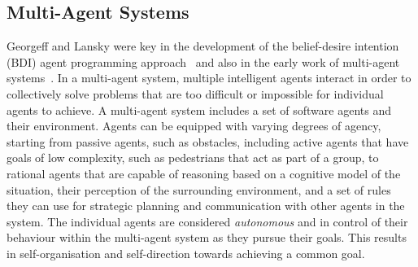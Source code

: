 \documentclass[letterpaper, 10 pt, journal, twoside]{IEEEtran}
\begin{document}



\subsection{Multi-Agent Systems}

Georgeff and Lansky were key in the development of the belief-desire intention (BDI) agent programming approach~\cite{georgeff1987reactive} and also in the early work of multi-agent systems~\cite{georgeff1988communication}.
%
In a multi-agent system, multiple intelligent agents interact in order to collectively solve problems that are too difficult or impossible for individual agents to achieve. 
%
A multi-agent system includes a set of software agents and their environment. Agents can be equipped with varying degrees of agency, starting from  passive agents, such as obstacles, including active agents that have goals of low complexity, such as pedestrians that act as part of a group, to rational agents that are capable of reasoning based on a cognitive model of the situation, their perception of the surrounding environment, and a set of rules they can use for strategic planning and communication with other agents in the system.
%
The individual agents are considered \textit{autonomous} and in control of their behaviour within the multi-agent system as they pursue their goals. 
% 
This results in self-organisation and self-direction towards achieving a common goal. 
\end{document}
